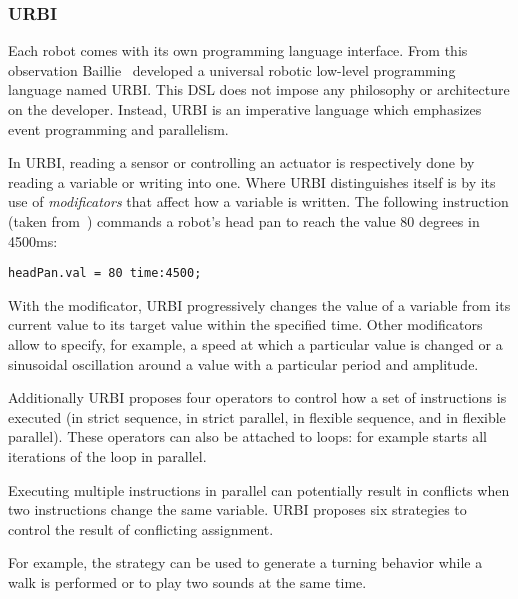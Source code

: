 \subsubsection{URBI}

Each robot comes with its own programming language interface. From
this observation Baillie~\cite{Baillie:2005} developed a universal
robotic low-level programming language named URBI. This DSL does not
impose any philosophy or architecture on the developer. Instead, URBI
is an imperative language which emphasizes event programming and
parallelism.

In URBI, reading a sensor or controlling an actuator is respectively
done by reading a variable or writing into one. Where URBI
distinguishes itself is by its use of \emph{modificators} that affect
how a variable is written. The following instruction (taken
from~\cite{Baillie:2005}) commands a robot's head pan to reach the
value 80 degrees in 4500ms:

\begin{verbatim}
headPan.val = 80 time:4500;
\end{verbatim}

With the  modificator, URBI progressively changes the value
of a variable from its current value to its target value within the
specified time. Other modificators allow to specify, for example, a
speed at which a particular value is changed or a sinusoidal
oscillation around a value with a particular period and amplitude.

Additionally URBI proposes four operators to control how a set of
instructions is executed (in strict sequence, in strict parallel, in
flexible sequence, and in flexible parallel). These operators can also
be attached to loops: for example  starts all iterations of
the loop in parallel.

Executing multiple instructions in parallel can potentially result in
conflicts when two instructions change the same variable. URBI
proposes six strategies to control the result of conflicting
assignment. %

For example, the  strategy can be used to generate a turning
behavior while a walk is performed or to play two sounds at the same
time.

